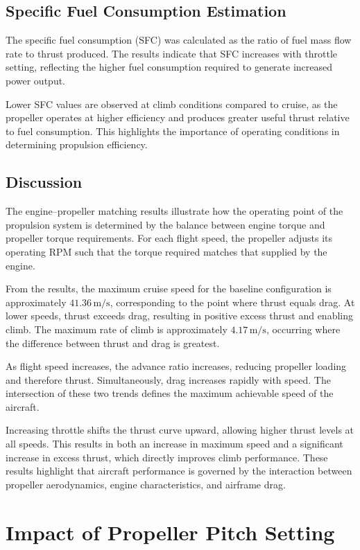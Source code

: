 \documentclass[a4paper,12pt]{article} %
\begin{document}
\subsection{Specific Fuel Consumption Estimation}

The specific fuel consumption (SFC) was calculated as the ratio of fuel mass flow rate to thrust produced. The results indicate that SFC increases with throttle setting, reflecting the higher fuel consumption required to generate increased power output.

Lower SFC values are observed at climb conditions compared to cruise, as the propeller operates at higher efficiency and produces greater useful thrust relative to fuel consumption. This highlights the importance of operating conditions in determining propulsion efficiency.

\subsection{Discussion}
The engine--propeller matching results illustrate how the operating point of the propulsion 
system is determined by the balance between engine torque and propeller torque requirements. 
For each flight speed, the propeller adjusts its operating RPM such that the torque required 
matches that supplied by the engine.

From the results, the maximum cruise speed for the baseline configuration is approximately 
$41.36\,\text{m/s}$, corresponding to the point where thrust equals drag. At lower speeds, 
thrust exceeds drag, resulting in positive excess thrust and enabling climb. The maximum 
rate of climb is approximately $4.17\,\text{m/s}$, occurring where the difference between 
thrust and drag is greatest.

As flight speed increases, the advance ratio increases, reducing propeller loading and 
therefore thrust. Simultaneously, drag increases rapidly with speed. The intersection of 
these two trends defines the maximum achievable speed of the aircraft.

Increasing throttle shifts the thrust curve upward, allowing higher thrust levels at all 
speeds. This results in both an increase in maximum speed and a significant increase in 
excess thrust, which directly improves climb performance. These results highlight that 
aircraft performance is governed by the interaction between propeller aerodynamics, engine 
characteristics, and airframe drag.

\section{Impact of Propeller Pitch Setting}
\end{document}
